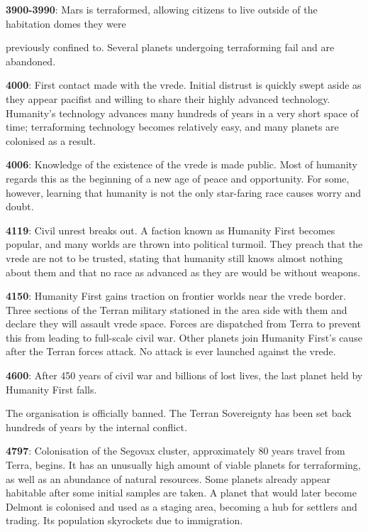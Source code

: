 \documentclass{scrbook}
\begin{document}
\textbf{3900-3990}: Mars is terraformed, allowing citizens to live outside of the habitation domes they were

previously confined to. Several planets undergoing terraforming fail and are abandoned.

\textbf{4000}: First contact made with the vrede. Initial distrust is quickly swept aside as they appear pacifist and willing to share their highly advanced technology. Humanity's technology advances many hundreds of years in a very short space of time; terraforming technology becomes relatively easy, and many planets are colonised as a result.

\textbf{4006}: Knowledge of the existence of the vrede is made public. Most of humanity regards this as the beginning of a new age of peace and opportunity. For some, however, learning that humanity is not the only star-faring race causes worry and doubt.

\textbf{4119}: Civil unrest breaks out. A faction known as Humanity First becomes popular, and many worlds are thrown into political turmoil. They preach that the vrede are not to be trusted, stating that humanity still knows almost nothing about them and that no race as advanced as they are would be without weapons.

\textbf{4150}: Humanity First gains traction on frontier worlds near the vrede border. Three sections of the Terran military stationed in the area side with them and declare they will assault vrede space. Forces are dispatched from Terra to prevent this from leading to full-scale civil war. Other planets join Humanity First's cause after the Terran forces attack. No attack is ever launched against the vrede.

\textbf{4600}: After 450 years of civil war and billions of lost lives, the last planet held by Humanity First falls.

The organisation is officially banned. The Terran Sovereignty has been set back hundreds of years by the internal conflict.

\textbf{4797}: Colonisation of the Segovax cluster, approximately 80 years travel from Terra, begins. It has an unusually high amount of viable planets for terraforming, as well as an abundance of natural resources. Some planets already appear habitable after some initial samples are taken. A planet that would later become Delmont is colonised and used as a staging area, becoming a hub for settlers and trading. Its population skyrockets due to immigration.
\end{document}
